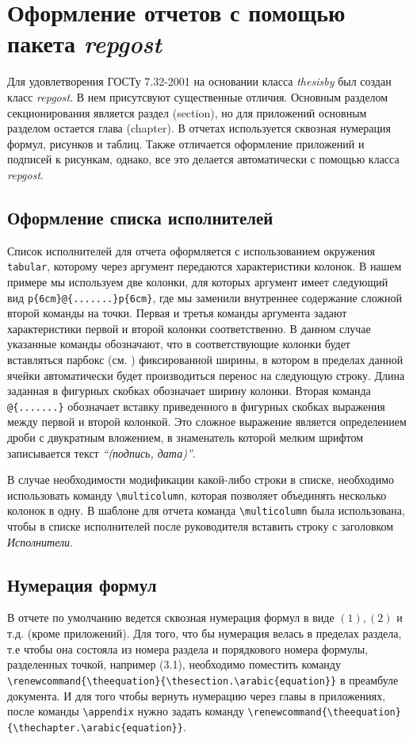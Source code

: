 \section{Оформление отчетов с помощью пакета {\itshape repgost}}\label{sec:repgost}

Для удовлетворения ГОСТу 7.32-2001 на основании класса {\itshape thesisby} был создан класс {\itshape repgost}. В нем присутсвуют существенные отличия. Основным разделом секционирования является раздел (section), но для приложений основным разделом остается глава (chapter). В отчетах используется сквозная нумерация формул, рисунков и таблиц. Также отличается оформление приложений и подписей к рисункам, однако, все это делается автоматически с помощью класса {\itshape repgost}. 

\subsection{Оформление списка исполнителей}

Список исполнителей для отчета оформляется с использованием окружения \verb|tabular|, которому через аргумент передаются характеристики колонок. В нашем примере мы используем две колонки, для которых аргумент имеет следующий вид \verb|p{6cm}@{.......}p{6cm}|, где мы заменили внутреннее содержание сложной второй команды на точки. Первая и третья команды аргумента задают характеристики первой и второй колонки соответственно. В данном случае указанные команды обозначают, что в соответствующие колонки будет вставляться парбокс (см. \cite[глава 9]{Kotelnikov}) фиксированной ширины, в котором в пределах данной ячейки автоматически будет производиться перенос на следующую строку. Длина заданная в фигурных скобках обозначает ширину колонки. Вторая команда \verb|@{.......}| обозначает вставку приведенного в фигурных скобках выражения между первой и второй колонкой. Это сложное выражение является определением дроби с двукратным вложением, в знаменатель которой мелким шрифтом записывается текст {\itshape ``(подпись,
дата)''}.

В случае необходимости модификации какой-либо строки в списке, необходимо использовать команду \verb|\multicolumn|, которая позволяет объединять несколько колонок в одну. В шаблоне для отчета команда \verb|\multicolumn| была использована, чтобы в списке исполнителей после руководителя вставить строку с заголовком {\itshape Исполнители}.

\subsection{Нумерация формул}

В отчете по умолчанию ведется сквозная нумерация формул  в виде $(1), (2)$ и т.д. (кроме приложений). Для того, что бы нумерация велась в пределах раздела, т.е чтобы она состояла  из номера раздела и порядкового номера формулы, разделенных точкой, например (3.1), необходимо поместить команду \verb|\renewcommand{\theequation}{\thesection.\arabic{equation}}| в преамбуле документа. И для того чтобы вернуть нумерацию через главы в приложениях, после команды \verb|\appendix| нужно задать команду \verb|\renewcommand{\theequation}{\thechapter.\arabic{equation}}|.